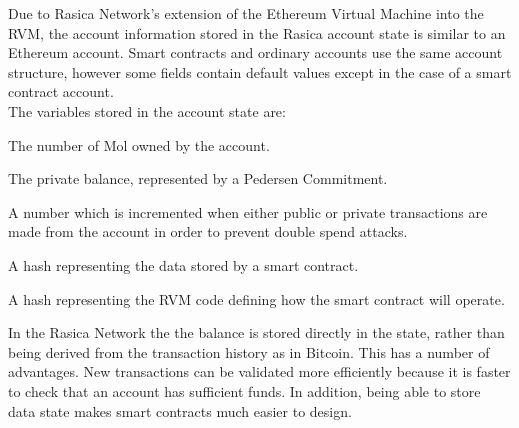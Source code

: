 Due to Rasica Network’s extension of the Ethereum Virtual Machine into the RVM, the account information stored in the Rasica account state is similar to an Ethereum account. Smart contracts and ordinary accounts use the same account structure, however some fields contain default values except in the case of a smart contract account. \\

The variables stored in the account state are:

\begin{description}[labelwidth=2cm, leftmargin=!]
\item [Balance] The number of Mol \cite{KATUnit} owned by the account.
\item [Commitment] The private balance, represented by a Pedersen Commitment.
\item [Nonce] A number which is incremented when either public or private transactions are made from the account in order to prevent double spend attacks.
\item [StorageRoot] A hash representing the data stored by a smart contract.
\item [CodeHash] A hash representing the RVM code defining how the smart contract will operate.
\end{description}
\vspace{0.75em}
In the Rasica Network the the balance is stored directly in the state, rather than being derived from the transaction history as in Bitcoin. This has a number of advantages. New transactions can be validated more efficiently because it is faster to check that an account has sufficient funds. In addition, being able to store data state makes smart contracts much easier to design.